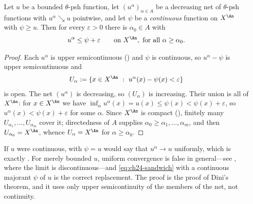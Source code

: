 \begin{lemma}
\label{lem:ch24-sandwich}
Let $u$ be a bounded $\theta$-psh function, let
$(u^\alpha)_{\alpha\in A}$ be a decreasing net of $\theta$-psh functions
with $u^\alpha\searrow u$ pointwise, and let $\psi$ be a
\emph{continuous} function on $X^{\An}$ with $\psi\geq u$.  Then for
every $\varepsilon>0$ there is $\alpha_0\in A$ with
\begin{equation}
\label{eq:ch24-sandwich}
       u^{\alpha}\leq\psi+\varepsilon
       \qquad\text{on }X^{\An},\ \text{for all }\alpha\geq\alpha_0 .
\end{equation}
\end{lemma}

\begin{proof}
Each $u^\alpha$ is upper semicontinuous
() and $\psi$ is continuous, so
$u^\alpha-\psi$ is upper semicontinuous and
\[
 U_\alpha:=\{x\in X^{\An}\ :\ u^\alpha(x)-\psi(x)<\varepsilon\}
\]
is open.  The net $(u^\alpha)$ is decreasing, so $(U_\alpha)$ is
increasing.  Their union is all of $X^{\An}$: for $x\in X^{\An}$ we have
$\inf_\alpha u^\alpha(x)=u(x)\leq\psi(x)<\psi(x)+\varepsilon$, so
$u^{\alpha}(x)<\psi(x)+\varepsilon$ for some $\alpha$.  Since
$X^{\An}$ is compact (), finitely many
$U_{\alpha_1},\ldots,U_{\alpha_m}$ cover it; directedness of $A$ supplies
$\alpha_0\geq\alpha_1,\ldots,\alpha_m$, and then
$U_{\alpha_0}=X^{\An}$, whence $U_\alpha=X^{\An}$ for
$\alpha\geq\alpha_0$.
\end{proof}

\begin{remark}
\label{rem:ch24-dini-form}
If $u$ were continuous,  with $\psi=u$ would say
that $u^\alpha\to u$ uniformly, which is exactly
.  For merely bounded $u$, uniform convergence is
false in general---see , where the limit is
discontinuous---and \eqref{eq:ch24-sandwich} with a continuous majorant
$\psi$ of $u$ is the correct replacement.  The proof is the proof of
Dini's theorem, and it uses only upper semicontinuity of the members of the
net, not continuity.
\end{remark}

